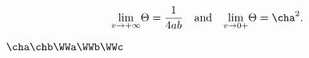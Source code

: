 \documentclass{article}
\begin{document}
\begin{equation}
\underset{v \rightarrow +\infty }{\mathrm{lim}}\Theta =\dfrac{1}{4ab} \quad \mathrm{and} \quad \underset{v \rightarrow 0+}{\mathrm{lim}}\Theta =\cha ^{2} .
\end{equation}

\tracingall
$\cha\chb\WWa\WWb\WWc$
\end{document}
